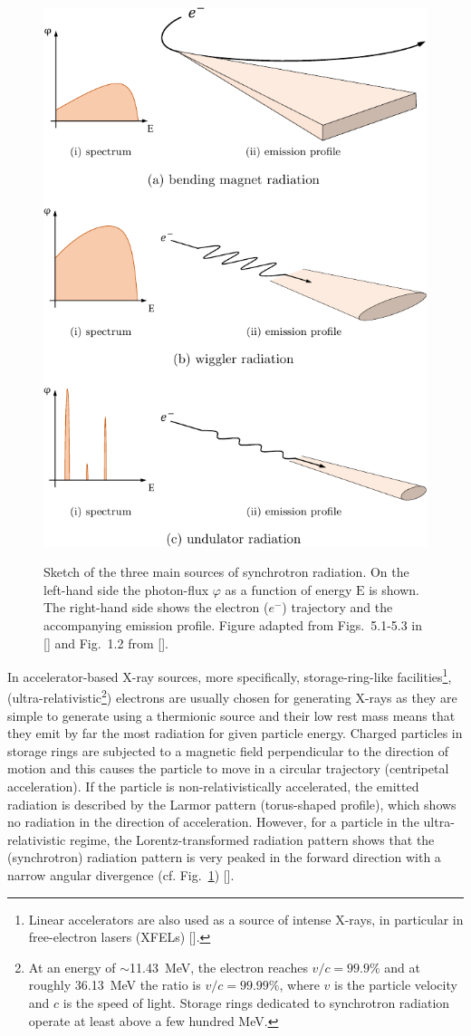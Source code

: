 \begin{refsection}
\begin{figure}[t]
    \centering
    {\includegraphics[width=.55\linewidth]{figures/ch02/x-ray_sources.pdf}}
    \caption[Synchrotron radiation emission]{Sketch of the three main sources of synchrotron radiation. On the left-hand side the photon-flux $\varphi$ as a function of energy $\mathrm{E}$ is shown. The right-hand side shows the electron ($e^-$) trajectory and the accompanying emission profile. Figure adapted from Figs.~5.1-5.3 in [\cite{Attwood1999}] and Fig.~1.2 from [\cite{Clarke2004}].}
    \label{fig:emission}
\end{figure}

In accelerator-based X-ray sources, more specifically, storage-ring-like facilities\footnote{Linear accelerators are also used as a source of intense X-rays, in particular in free-electron lasers (XFELs) [\cite{Huang2007}].}, (ultra-relativistic\footnote{At an energy of $\sim$11.43~MeV, the electron reaches $v/c = 99.9\%$ and at roughly 36.13~MeV the ratio is $v/c = 99.99\%$, where $v$ is the particle velocity and $c$ is the speed of light. Storage rings dedicated to synchrotron radiation operate at least above a few hundred MeV.}) electrons are usually chosen for generating X-rays as they are simple to generate using a thermionic source and their low rest mass means that they emit by far the most radiation for given particle energy. Charged particles in storage rings are subjected to a magnetic field perpendicular to the direction of motion and this causes the particle to move in a circular trajectory (centripetal acceleration). If the particle is non-relativistically accelerated, the emitted radiation is described by the Larmor pattern (torus-shaped profile), which shows no radiation in the direction of acceleration. However, for a particle in the ultra-relativistic regime, the Lorentz-transformed radiation pattern shows that the (synchrotron) radiation pattern is very peaked in the forward direction with a narrow angular divergence (cf. Fig.~\ref{fig:emission}) [\cite{Jackson1998}].


\end{refsection}
